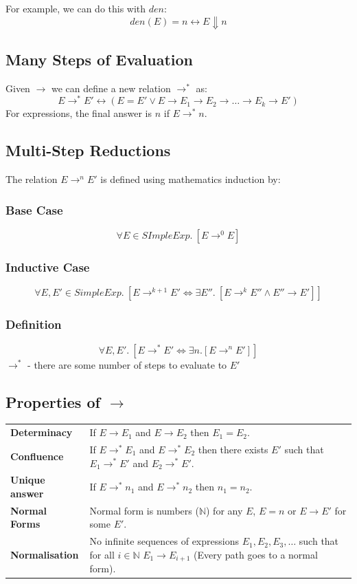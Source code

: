 For example, we can do this with $den$:
\[den(E) = n \leftrightarrow E \Downarrow n\]

\subsection{Many Steps of Evaluation}
Given $\to$ we can define a new relation $\to^*$ as:
\[E \to^* E' \leftrightarrow (E = E' \lor E \to E_1 \to E_2 \to \dots \to E_k \to E')\]
For expressions, the final answer is $n$ if $E \to^* n$.
\subsection{Multi-Step Reductions}
The relation $E \to^n E'$ is defined using mathematics induction by:
\subsubsection{Base Case}
\[\forall E \in SImpleExp . \ [E \to^0 E]\]

\subsubsection{Inductive Case}
\[\forall E, E' \in SimpleExp . \ [E \to^{k+1} E' \Leftrightarrow \exists E'' . \ [E \to^k E'' \land E'' \to E']]\]

\subsubsection{Definition}
\[\forall E, E' . \ [E \to^* E' \Leftrightarrow \exists n.[E \to^n E']]\]
$\to^*$ - there are some number of steps to evaluate to $E'$

\subsection*{Properties of $\to$}
\begin{center}
    \begin{tabular}{l p{}}
        \textbf{Determinacy}   & If $E \to E_1$ and $E \to E_2$ then $E_1 = E_2$. \\
        \textbf{Confluence}    & If $E \to^* E_1$ and $E \to^*E_2$ then there exists $E'$ such that $E_1 \to^* E'$ and $E_2 \to^* E'$. \\
        \textbf{Unique answer} & If $E \to^* n_1$ and $E \to^* n_2$ then $n_1 = n_2$. \\
        \textbf{Normal Forms}  & Normal form is numbers ($\mathbb{N}$) for any $E$, $E = n$ or $E \to E'$ for some $E'$. \\
        \textbf{Normalisation} & No infinite sequences of expressions $E_1,E_2,E_3, \dots$ such that for all $i \in \mathbb{N}$ $E_1 \to E_{i+1}$ (Every path goes to a normal form). \\
    \end{tabular}
\end{center}


